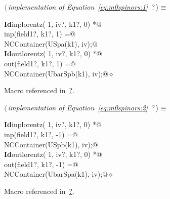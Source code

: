 \documentclass[a4paper,12pt]{amsart}
\renewcommand{\NWtarget}[2]{\hypertarget{#1}{#2}}
\renewcommand{\NWlink}[2]{\hyperlink{#1}{#2}}
\renewcommand{\NWtxtMacroRefIn}{Macro referenced in}
\renewcommand{\NWsep}{${\diamond}$}
\begin{document}
\begin{flushleft} \small
\begin{minipage}{\linewidth}\label{scrap9}\raggedright\small
\NWtarget{nuweb?}{} $\langle\,${\it implementation of Equation~\eqref{eq:m0spinors:1}}\nobreak\ {\footnotesize {?}}$\,\rangle\equiv$
\vspace{-1ex}
\begin{list}{}{} \item
\mbox{}\verb@@\hbox{\sffamily\bfseries Id}\verb@ inplorentz( 1, iv?, k1?, 0) *@\\
\mbox{}\verb@      inp(field1?, k1?,  1) =@\\
\mbox{}\verb@   NCContainer(USpa(k1), iv);@\\
\mbox{}\verb@@\hbox{\sffamily\bfseries Id}\verb@ outlorentz( 1, iv?, k1?, 0) *@\\
\mbox{}\verb@      out(field1?, k1?,  1) =@\\
\mbox{}\verb@   NCContainer(UbarSpb(k1), iv);@{\NWsep}
\end{list}
\vspace{-1.5ex}
\footnotesize
\begin{list}{}{\setlength{\itemsep}{-\parsep}\setlength{\itemindent}{-\leftmargin}}
\item \NWtxtMacroRefIn\ \NWlink{nuweb?}{?}.

\item{}
\end{list}
\end{minipage}\vspace{4ex}
\end{flushleft}
\begin{flushleft} \small
\begin{minipage}{\linewidth}\label{scrap10}\raggedright\small
\NWtarget{nuweb?}{} $\langle\,${\it implementation of Equation~\eqref{eq:m0spinors:2}}\nobreak\ {\footnotesize {?}}$\,\rangle\equiv$
\vspace{-1ex}
\begin{list}{}{} \item
\mbox{}\verb@@\hbox{\sffamily\bfseries Id}\verb@ inplorentz( 1, iv?, k1?, 0) *@\\
\mbox{}\verb@      inp(field1?, k1?, -1) =@\\
\mbox{}\verb@   NCContainer(USpb(k1), iv);@\\
\mbox{}\verb@@\hbox{\sffamily\bfseries Id}\verb@ outlorentz( 1, iv?, k1?, 0) *@\\
\mbox{}\verb@      out(field1?, k1?, -1) =@\\
\mbox{}\verb@   NCContainer(UbarSpa(k1), iv);@{\NWsep}
\end{list}
\vspace{-1.5ex}
\footnotesize
\begin{list}{}{\setlength{\itemsep}{-\parsep}\setlength{\itemindent}{-\leftmargin}}
\item \NWtxtMacroRefIn\ \NWlink{nuweb?}{?}.

\item{}
\end{list}
\end{minipage}\vspace{4ex}
\end{flushleft}
\end{document}
